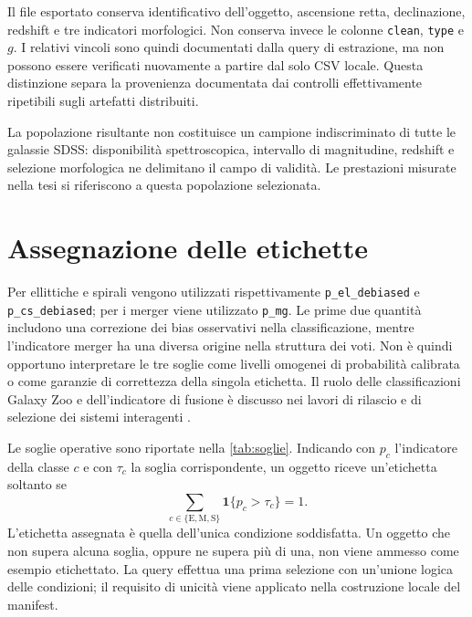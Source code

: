 Il file esportato conserva identificativo dell'oggetto, ascensione retta,
declinazione, redshift e tre indicatori morfologici. Non conserva invece
le colonne \texttt{clean}, \texttt{type} e \(g\). I relativi vincoli sono
quindi documentati dalla query di estrazione, ma non possono essere
verificati nuovamente a partire dal solo CSV locale. Questa distinzione
separa la provenienza documentata dai controlli effettivamente ripetibili
sugli artefatti distribuiti.

La popolazione risultante non costituisce un campione indiscriminato di
tutte le galassie SDSS: disponibilità spettroscopica, intervallo di
magnitudine, redshift e selezione morfologica ne delimitano il campo di
validità. Le prestazioni misurate nella tesi si riferiscono a questa
popolazione selezionata.

\section{Assegnazione delle etichette}
\label{sec:etichette}

Per ellittiche e spirali vengono utilizzati rispettivamente
\texttt{p\_el\_debiased} e \texttt{p\_cs\_debiased}; per i merger viene
utilizzato \texttt{p\_mg}. Le prime due quantità includono una correzione
dei bias osservativi nella classificazione, mentre l'indicatore merger
ha una diversa origine nella struttura dei voti. Non è quindi opportuno
interpretare le tre soglie come livelli omogenei di probabilità calibrata
o come garanzie di correttezza della singola etichetta. Il ruolo delle
classificazioni Galaxy Zoo e dell'indicatore di fusione è discusso nei
lavori di rilascio e di selezione dei sistemi interagenti
\cite{lintott2011galaxyzoo,darg2010mergers}.

Le soglie operative sono riportate nella \cref{tab:soglie}. Indicando con
\(p_c\) l'indicatore della classe \(c\) e con \(\tau_c\) la soglia
corrispondente, un oggetto riceve un'etichetta soltanto se
\begin{equation}
  \sum_{c\in\{\mathrm{E},\mathrm{M},\mathrm{S}\}}
  \mathbf{1}\{p_c>\tau_c\}=1.
  \label{eq:etichetta-univoca}
\end{equation}
L'etichetta assegnata è quella dell'unica condizione soddisfatta. Un oggetto
che non supera alcuna soglia, oppure ne supera più di una, non viene
ammesso come esempio etichettato. La query effettua una prima selezione
con un'unione logica delle condizioni; il requisito di unicità viene
applicato nella costruzione locale del manifest.


